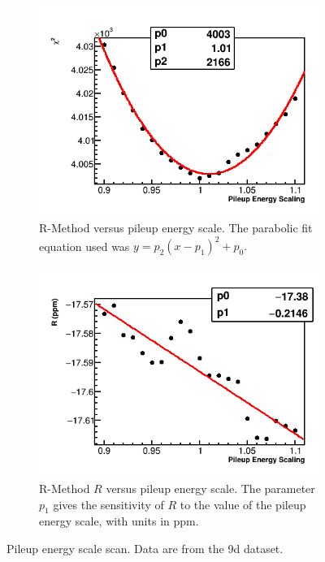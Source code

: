 \begin{figure}[h]
    \begin{subfigure}[t]{0.45\textwidth}
        \centering
        \includegraphics[width=\textwidth]{FullRatio_Chi2_Vs_PileupEnergyScaling_Canv}
        \caption{R-Method \chisq versus pileup energy scale. The parabolic fit equation used was $y = p_{2}(x - p_{1})^{2} + p_{0}.$}
    \end{subfigure}%
    \hspace{1cm}
    \begin{subfigure}[t]{0.45\textwidth}
        \centering
        \includegraphics[width=\textwidth]{FullRatio_R_Vs_PileupEnergyScaling_Canv}
        \caption{R-Method $R$ versus pileup energy scale. The parameter $p_{1}$ gives the sensitivity of $R$ to the value of the pileup energy scale, with units in ppm.}
    \end{subfigure}
\caption[Pileup energy scale scan]{Pileup energy scale scan. Data are from the 9d dataset.}
\label{fig:PESscan}
\end{figure}



